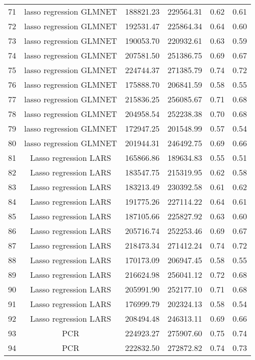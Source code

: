 \begin{tabular}{cccccc}
  71 & lasso regression GLMNET & 188821.23 & 229564.31 & 0.62 & 0.61 \\ 
  72 & lasso regression GLMNET & 192531.47 & 225864.34 & 0.64 & 0.60 \\ 
  73 & lasso regression GLMNET & 190053.70 & 220932.61 & 0.63 & 0.59 \\ 
  74 & lasso regression GLMNET & 207581.50 & 251386.75 & 0.69 & 0.67 \\ 
  75 & lasso regression GLMNET & 224744.37 & 271385.79 & 0.74 & 0.72 \\ 
  76 & lasso regression GLMNET & 175888.70 & 206841.59 & 0.58 & 0.55 \\ 
  77 & lasso regression GLMNET & 215836.25 & 256085.67 & 0.71 & 0.68 \\ 
  78 & lasso regression GLMNET & 204958.54 & 252238.38 & 0.70 & 0.68 \\ 
  79 & lasso regression GLMNET & 172947.25 & 201548.99 & 0.57 & 0.54 \\ 
  80 & lasso regression GLMNET & 201944.31 & 246492.75 & 0.69 & 0.66 \\ 
  81 & Lasso regression LARS & 165866.86 & 189634.83 & 0.55 & 0.51 \\ 
  82 & Lasso regression LARS & 183547.75 & 215319.95 & 0.62 & 0.58 \\ 
  83 & Lasso regression LARS & 183213.49 & 230392.58 & 0.61 & 0.62 \\ 
  84 & Lasso regression LARS & 191775.26 & 227114.22 & 0.64 & 0.61 \\ 
  85 & Lasso regression LARS & 187105.66 & 225827.92 & 0.63 & 0.60 \\ 
  86 & Lasso regression LARS & 205716.74 & 252253.46 & 0.69 & 0.67 \\ 
  87 & Lasso regression LARS & 218473.34 & 271412.24 & 0.74 & 0.72 \\ 
  88 & Lasso regression LARS & 170173.09 & 206947.45 & 0.58 & 0.55 \\ 
  89 & Lasso regression LARS & 216624.98 & 256041.12 & 0.72 & 0.68 \\ 
  90 & Lasso regression LARS & 205991.90 & 252177.10 & 0.71 & 0.68 \\ 
  91 & Lasso regression LARS & 176999.79 & 202324.13 & 0.58 & 0.54 \\ 
  92 & Lasso regression LARS & 208494.48 & 246313.11 & 0.69 & 0.66 \\ 
  93 & PCR & 224923.27 & 275907.60 & 0.75 & 0.74 \\ 
  94 & PCR & 222832.50 & 272872.82 & 0.74 & 0.73 \\ 

\end{tabular}

